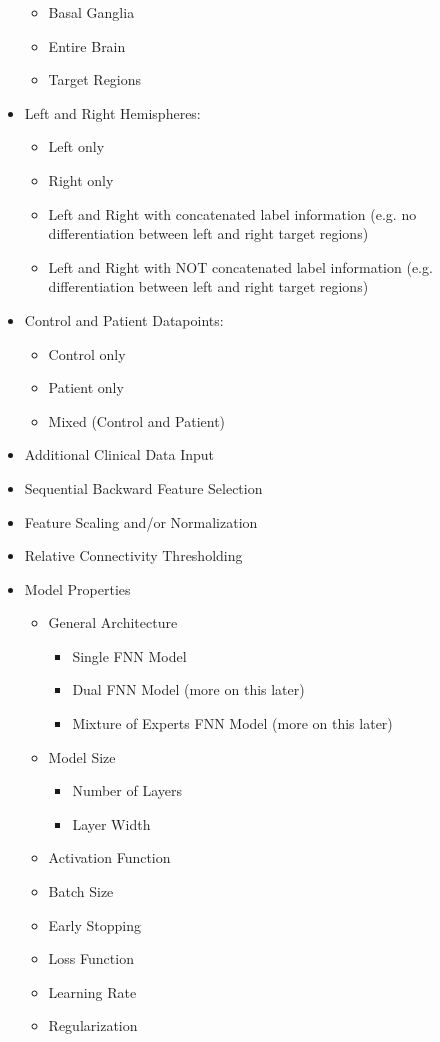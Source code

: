 \begin{itemize}
\begin{itemize}
    \item Basal Ganglia
    \item Entire Brain
    \item Target Regions
  \end{itemize}
  \item Left and Right Hemispheres:
  \begin{itemize}
    \item Left only
    \item Right only
    \item Left and Right with concatenated label information (e.g. no differentiation between left and right target regions)
    \item Left and Right with NOT concatenated label information (e.g. differentiation between left and right target regions)
  \end{itemize}
  \item Control and Patient Datapoints:
  \begin{itemize}
    \item Control only
    \item Patient only
    \item Mixed (Control and Patient)
  \end{itemize}
  \item Additional Clinical Data Input
  \item Sequential Backward Feature Selection
  \item Feature Scaling and/or Normalization
  \item Relative Connectivity Thresholding
  \item Model Properties
  \begin{itemize}
    \item General Architecture
    \begin{itemize}
      \item Single FNN Model
      \item Dual FNN Model (more on this later)
      \item Mixture of Experts FNN Model (more on this later)
    \end{itemize}
    \item Model Size
    \begin{itemize}
      \item Number of Layers
      \item Layer Width
    \end{itemize}
    \item Activation Function
    \item Batch Size
    \item Early Stopping
    \item Loss Function
    \item Learning Rate
    \item Regularization
  \end{itemize}
\end{itemize}

